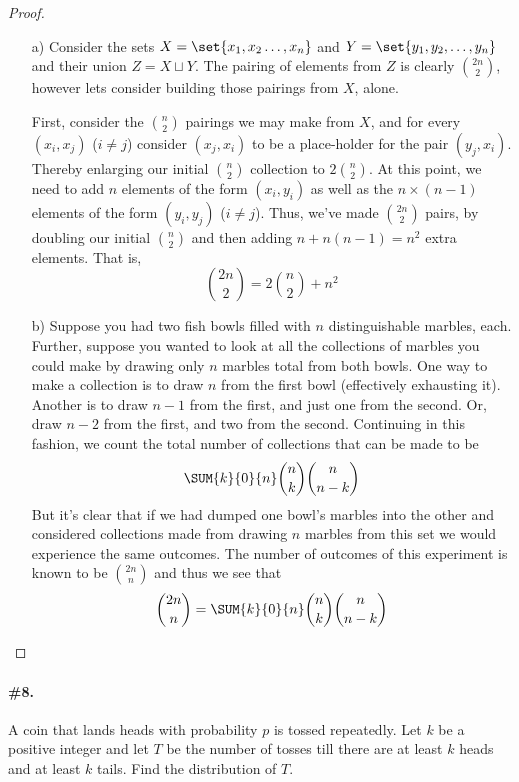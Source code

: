 \documentclass[12pt,titlepage]{article}
\begin{document}
\begin{proof}
\begin{enumerate}
\item[a)]
Consider the sets $X = \set{x_1, x_2 \ldots, x_n}$ and $Y = \set{y_1, y_2, \ldots, y_n}$ and their union $Z = X \sqcup Y$. 
The pairing of elements from $Z$ is clearly $\binom{2n}{2}$, however lets consider building those pairings from $X$, alone. 

First, consider the $\binom{n}{2}$ pairings we may make from $X$, and for every $(x_i, x_j)$ ($i\neq j$) consider $(x_j,x_i)$ to be a place-holder for the pair $(y_j, x_i)$. Thereby enlarging our initial $\binom{n}{2}$ collection to $2 \binom{n}{2}$. At this point, we need to add $n$ elements of the form $(x_i, y_i)$ as well as the $n\times (n-1)$ elements of the form $(y_i, y_j)$ ($i\neq j$). Thus, we've made $\binom{2n}{2}$ pairs, by doubling our initial $\binom{n}{2}$ and then adding $n + n(n-1) = n^2$ extra elements. That is,
\[
\binom{2n}{2} = 2 \binom{n}{2} + n^2
\]
\item[b)] Suppose you had two fish bowls filled with $n$ distinguishable marbles, each. Further, suppose you wanted to look at all the collections of marbles you could make by drawing only $n$ marbles total from both bowls. One way to make a collection is to draw $n$ from the first bowl (effectively exhausting it). Another is to draw $n-1$ from the first, and just one from the second. Or, draw $n-2$ from the first, and two from the second. Continuing in this fashion, we count the total number of collections that can be made to be
\[
\SUM{k}{0}{n} \binom{n}{k}\binom{n}{n-k}
\]
But it's clear that if we had dumped one bowl's marbles into the other and considered collections made from drawing $n$ marbles from this set we would experience the same outcomes. The number of outcomes of this experiment is known to be $\binom{2n}{n}$ and thus we see that
\[
\binom{2n}{n} = \SUM{k}{0}{n} \binom{n}{k}\binom{n}{n-k}
\]

\end{enumerate}

\end{proof}


\paragraph{\#8.} A coin that lands heads with probability $p$ is tossed repeatedly. Let $k$ be a positive integer and let $T$ be the number of tosses till there are at least $k$ heads and at least $k$ tails. Find the distribution of $T$. 
\end{document}
